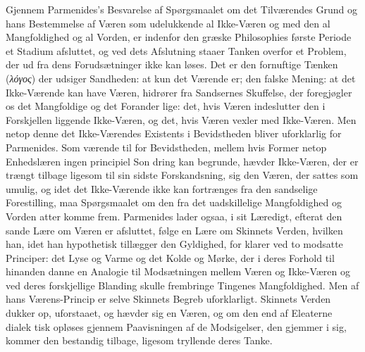 \documentclass[12pt,a4paper]{book}
\newcommand{\gk}[1]{\textit{#1}}
\begin{document}
Gjennem Parmenides's Besvarelse af Spørgsmaalet om
det Tilværendes Grund og hans Bestemmelse af Væren som
udelukkende al Ikke-Væren og med den al Mangfoldighed
og al Vorden, er indenfor den græske Philosophies første
Periode et Stadium afsluttet, og ved dets Afslutning staaer
Tanken overfor et Problem, der ud fra dens Forudsætninger
ikke kan løses. Det er den fornuftige Tænken (\gk{λόγος}) der
udsiger Sandheden: at kun det Værende er; den falske Mening:
at det Ikke-Værende kan have Væren, hidrører fra Sandsernes
Skuffelse, der foregjøgler os det Mangfoldige og det Forander\-%
lige: det, hvis Væren indeslutter den i Forskjellen liggende
Ikke-Væren, og det, hvis Væren vexler med Ikke-Væren. Men
netop denne det Ikke-Værendes Existents i Bevidstheden bliver
%
uforklarlig for Parmenides. Som værende til for Bevidstheden,
mellem hvis Former netop Enhedslæren ingen principiel Son\-%
dring kan begrunde, hævder Ikke-Væren, der er trængt tilbage
ligesom til sin sidste Forskandsning, sig den Væren, der sattes
som umulig, og idet det Ikke-Værende ikke kan fortrænges
fra den sandselige Forestilling, maa Spørgsmaalet om den fra
det uadskillelige Mangfoldighed og Vorden atter komme frem.
Parmenides lader ogsaa, i sit Læredigt, efterat den sande Lære
om Væren er afsluttet, følge en Lære om Skinnets Verden,
hvilken han, idet han hypothetisk tillægger den Gyldighed, for\-%
klarer ved to modsatte Principer: det Lyse og Varme og det
Kolde og Mørke, der i deres Forhold til hinanden danne en
Analogie til Modsætningen mellem Væren og Ikke-Væren og
ved deres forskjellige Blanding skulle frembringe Tingenes
Mangfoldighed. Men af hans Værens-Princip er selve Skinnets
Begreb uforklarligt. Skinnets Verden dukker op, uforstaaet,
og hævder sig en Væren, og om den end af Eleaterne dialek\-%
tisk opløses gjennem Paavisningen af de Modsigelser, den
gjemmer i sig, kommer den bestandig tilbage, ligesom tryllende
deres Tanke.
\end{document}

